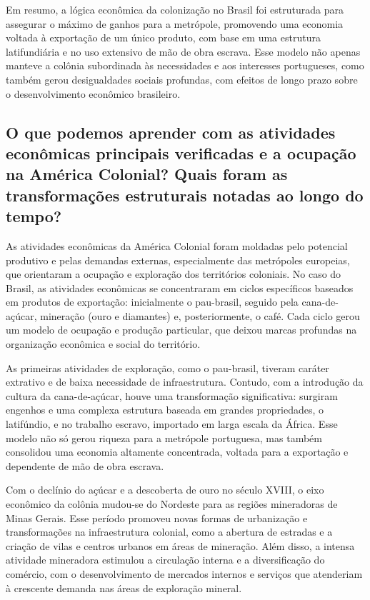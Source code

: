 \documentclass[a4paper,12pt]{article}[abntex2]
\begin{document}
Em resumo, a lógica econômica da colonização no Brasil foi estruturada para assegurar o máximo de ganhos para a metrópole, promovendo uma economia voltada à exportação de um único produto, com base em uma estrutura latifundiária e no uso extensivo de mão de obra escrava. Esse modelo não apenas manteve a colônia subordinada às necessidades e aos interesses portugueses, como também gerou desigualdades sociais profundas, com efeitos de longo prazo sobre o desenvolvimento econômico brasileiro.

\subsection{\textbf{O que podemos aprender com as atividades econômicas principais verificadas e a ocupação na América Colonial? Quais foram as transformações estruturais notadas ao longo do tempo?}}

As atividades econômicas da América Colonial foram moldadas pelo potencial produtivo e pelas demandas externas, especialmente das metrópoles europeias, que orientaram a ocupação e exploração dos territórios coloniais. No caso do Brasil, as atividades econômicas se concentraram em ciclos específicos baseados em produtos de exportação: inicialmente o pau-brasil, seguido pela cana-de-açúcar, mineração (ouro e diamantes) e, posteriormente, o café. Cada ciclo gerou um modelo de ocupação e produção particular, que deixou marcas profundas na organização econômica e social do território.

As primeiras atividades de exploração, como o pau-brasil, tiveram caráter extrativo e de baixa necessidade de infraestrutura. Contudo, com a introdução da cultura da cana-de-açúcar, houve uma transformação significativa: surgiram engenhos e uma complexa estrutura baseada em grandes propriedades, o latifúndio, e no trabalho escravo, importado em larga escala da África. Esse modelo não só gerou riqueza para a metrópole portuguesa, mas também consolidou uma economia altamente concentrada, voltada para a exportação e dependente de mão de obra escrava.

Com o declínio do açúcar e a descoberta de ouro no século XVIII, o eixo econômico da colônia mudou-se do Nordeste para as regiões mineradoras de Minas Gerais. Esse período promoveu novas formas de urbanização e transformações na infraestrutura colonial, como a abertura de estradas e a criação de vilas e centros urbanos em áreas de mineração. Além disso, a intensa atividade mineradora estimulou a circulação interna e a diversificação do comércio, com o desenvolvimento de mercados internos e serviços que atenderiam à crescente demanda nas áreas de exploração mineral.
\end{document}
